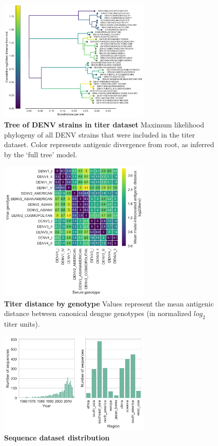 \documentclass[11pt,oneside,letterpaper]{article}
\begin{document}
\begin{figure}[h]
\centering
	\includegraphics[width=0.65\textwidth]{../figures/png/titered_strains_tree.png}
	\caption{\textbf{Tree of DENV strains in titer dataset}
  Maximum likelihood phylogeny of all DENV strains that were included in the titer dataset. Color represents antigenic divergence from root, as inferred by the `full tree' model.
	}
	\label{titered_strains_tree}
\end{figure}

\begin{figure}[h]
\centering
	\includegraphics[width=0.65\textwidth]{../figures/png/genotype_dTiter_heatmap.png}
	\caption{\textbf{Titer distance by genotype}
  Values represent the mean antigenic distance between canonical dengue genotypes (in normalized $log_2$ titer units).
  }
	\label{genotype_dTiter_heatmap}
\end{figure}

\begin{figure}[h]
\centering
	\includegraphics[width=0.65\textwidth]{../figures/png/sequence_distribution.png}
	\caption{\textbf{Sequence dataset distribution}
	}
	\label{sequence_distribution}
\end{figure}
\end{document}
